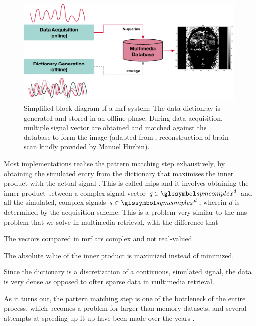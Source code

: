 \begin{figure}[tb]
    \centering
    \includegraphics[width=\textwidth]{figures/mrf.eps}
    \caption{Simplified block diagram of a \acrshort{mrf} system: The data dictionray is generated and stored in an offline phase. During data acquisition, multiple signal vector are obtained and matched against the database to form the image (adapted from \cite{Bipin:2019Magnetic}, reconstruction of brain scan kindly provided by Manuel Hürbin).}
    \label{figure:mrf}
\end{figure}

Most implementations realise the pattern matching step exhaustively, by obtaining the simulated entry from the dictionary that maximises the inner product with the actual signal \cite{Bipin:2019Magnetic}. This is called \acrfull{mips} and it involves obtaining the inner product between a complex signal vector $q \in \symcomplex^d$ and all the simulated, complex signals $s \in \symcomplex^d$, wherein $d$ is determined by the acquisition scheme. This is a problem very similar to the \acrshort{nns} problem that we solve in multimedia retrieval, with the difference that 
\begin{enumerate*}[label=(\roman*)]
    \item The vectors compared in \acrshort{mrf} are complex and not real-valued.
    \item The absolute value of the inner product is maximized instead of minimized.
    \item Since the dictionary is a discretization of a continuous, simulated signal, the data is very dense as opposed to often sparse data in multimedia retrieval.
\end{enumerate*}

As it turns out, the pattern matching step is one of the bottleneck of the entire process, which becomes a problem for larger-than-memory datasets, and several attempts at speeding-up it up have been made over the years \cite{Mcgivney:2014SVD}.

